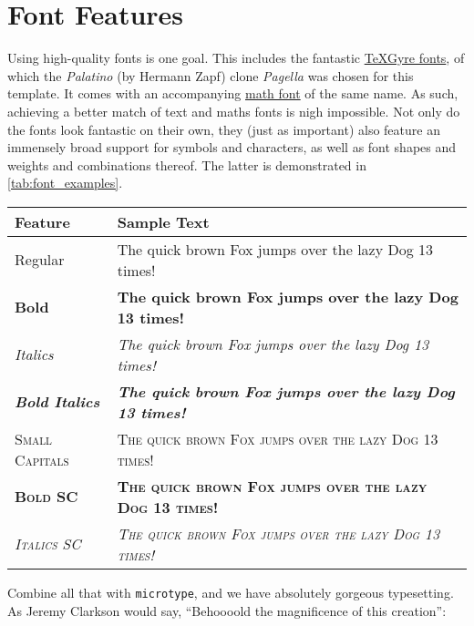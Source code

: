 \chapter{Font Features}




Using high-quality fonts is one goal.
This includes the fantastic \href{https://ctan.org/texarchive/fonts/tex-gyre/opentype}{\TeX Gyre fonts}, of which the \textit{Palatino} (by Hermann Zapf) clone \textit{Pagella} was chosen for this template.
It comes with an accompanying \href{https://ctan.org/texarchive/fonts/tex-gyre-math/opentype}{math font} of the same name.
As such, achieving a better match of text and maths fonts is nigh impossible.
Not only do the fonts look fantastic on their own, they (just as important) also feature an immensely broad support for symbols and characters, as well as font shapes and weights and combinations thereof.
The latter is demonstrated in \cref{tab:font_examples}.
%
\newcommand*{\sampletext}{The quick brown Fox jumps over the lazy Dog 13 times!}
\begin{table}
%
{%
	\begin{tabular}{@{}ll@{}}%
		\toprule
			Feature & Sample Text\\
		\midrule
			Regular & \sampletext\\
			\textbf{Bold} & \textbf{\sampletext}\\
			\textit{Italics} & \textit{\sampletext}\\
			\textbf{\textit{Bold Italics}} & \textbf{\textit{\sampletext}}\\
		\addlinespace%
			\textsc{Small Capitals} & \textsc{\sampletext}\\
			\textbf{\textsc{Bold SC}} & \textbf{\textsc{\sampletext}}\\
			\textit{\textsc{Italics SC}} & \textit{\textsc{\sampletext}}\\
		\bottomrule
	\end{tabular}
}%
\end{table}

Combine all that with \texttt{microtype}, and we have absolutely gorgeous typesetting.
As Jeremy Clarkson would say, \enquote{Behoooold the magnificence of this creation}:


